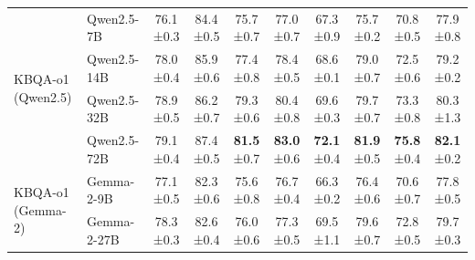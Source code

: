 \documentclass{article}
\theoremstyle{plain}
\theoremstyle{definition}
\theoremstyle{remark}
\begin{document}
\begin{table}[t]
{\begin{tabular}{llcccccc|cc}
\multirow{4}{*}{KBQA-o1 (Qwen2.5)} & Qwen2.5-7B & 76.1 {\fontsize{5pt}{5pt}\selectfont ±0.3} & 84.4 {\fontsize{5pt}{5pt}\selectfont ±0.5} & 75.7 {\fontsize{5pt}{5pt}\selectfont ±0.7} & 77.0 {\fontsize{5pt}{5pt}\selectfont ±0.7} & 67.3 {\fontsize{5pt}{5pt}\selectfont ±0.9} & 75.7 {\fontsize{5pt}{5pt}\selectfont ±0.2} & 70.8 {\fontsize{5pt}{5pt}\selectfont ±0.5} & 77.9 {\fontsize{5pt}{5pt}\selectfont ±0.8} \\ 
 & Qwen2.5-14B & 78.0 {\fontsize{5pt}{5pt}\selectfont ±0.4} & 85.9 {\fontsize{5pt}{5pt}\selectfont ±0.6} & 77.4 {\fontsize{5pt}{5pt}\selectfont ±0.8} & 78.4 {\fontsize{5pt}{5pt}\selectfont ±0.5} & 68.6 {\fontsize{5pt}{5pt}\selectfont ±0.1} & 79.0 {\fontsize{5pt}{5pt}\selectfont ±0.7} & 72.5 {\fontsize{5pt}{5pt}\selectfont ±0.6} & 79.2 {\fontsize{5pt}{5pt}\selectfont ±0.2} \\ 
 & Qwen2.5-32B & 78.9 {\fontsize{5pt}{5pt}\selectfont ±0.5} & 86.2 {\fontsize{5pt}{5pt}\selectfont ±0.7} & 79.3 {\fontsize{5pt}{5pt}\selectfont ±0.6} & 80.4 {\fontsize{5pt}{5pt}\selectfont ±0.8} & 69.6 {\fontsize{5pt}{5pt}\selectfont ±0.3} & 79.7 {\fontsize{5pt}{5pt}\selectfont ±0.7} & 73.3 {\fontsize{5pt}{5pt}\selectfont ±0.8} & 80.3 {\fontsize{5pt}{5pt}\selectfont ±1.3} \\ 
 & Qwen2.5-72B & 79.1 {\fontsize{5pt}{5pt}\selectfont ±0.4} & 87.4 {\fontsize{5pt}{5pt}\selectfont ±0.5} & \textbf{81.5} {\fontsize{5pt}{5pt}\selectfont ±0.7} & \textbf{83.0} {\fontsize{5pt}{5pt}\selectfont ±0.6} & \textbf{72.1} {\fontsize{5pt}{5pt}\selectfont ±0.4} & \textbf{81.9} {\fontsize{5pt}{5pt}\selectfont ±0.5} & \textbf{75.8} {\fontsize{5pt}{5pt}\selectfont ±0.4} & \textbf{82.1} {\fontsize{5pt}{5pt}\selectfont ±0.2} \\ \midrule
\multirow{2}{*}{KBQA-o1 (Gemma-2)} & Gemma-2-9B & 77.1 {\fontsize{5pt}{5pt}\selectfont ±0.5} & 82.3 {\fontsize{5pt}{5pt}\selectfont ±0.6} & 75.6 {\fontsize{5pt}{5pt}\selectfont ±0.8} & 76.7 {\fontsize{5pt}{5pt}\selectfont ±0.4} & 66.3 {\fontsize{5pt}{5pt}\selectfont ±0.2} & 76.4 {\fontsize{5pt}{5pt}\selectfont ±0.6} & 70.6 {\fontsize{5pt}{5pt}\selectfont ±0.7} & 77.8 {\fontsize{5pt}{5pt}\selectfont ±0.5} \\ 
 & Gemma-2-27B & 78.3 {\fontsize{5pt}{5pt}\selectfont ±0.3} & 82.6 {\fontsize{5pt}{5pt}\selectfont ±0.4} & 76.0 {\fontsize{5pt}{5pt}\selectfont ±0.6} & 77.3 {\fontsize{5pt}{5pt}\selectfont ±0.5} & 69.5 {\fontsize{5pt}{5pt}\selectfont ±1.1} & 79.6 {\fontsize{5pt}{5pt}\selectfont ±0.7} & 72.8 {\fontsize{5pt}{5pt}\selectfont ±0.5} & 79.7 {\fontsize{5pt}{5pt}\selectfont ±0.3} \\ \bottomrule
\end{tabular}}
\vspace{-3mm}
\end{table}
\end{document}
